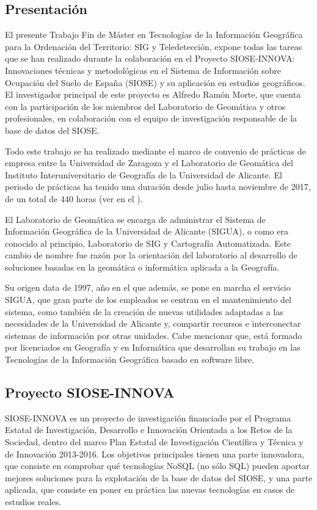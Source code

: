 
\begin{prologo}

\subsection*{Presentación}
El presente Trabajo Fin de Máster en Tecnologías de la Información Geográfica para la Ordenación del Territorio: SIG y Teledetección, expone todas las tareas que se han realizado durante la colaboración en el Proyecto SIOSE-INNOVA: Innovaciones técnicas y metodológicas en el Sistema de Información sobre Ocupación del Suelo de España (SIOSE) y su aplicación en estudios geográficos. El investigador principal de este proyecto es Alfredo Ramón Morte, que cuenta con la participación de los miembros del Laboratorio de Geomática y otros profesionales, en colaboración con el equipo de investigación responsable de la base de datos del SIOSE.

Todo este trabajo se ha realizado mediante el marco de convenio de prácticas de empresa entre la Universidad de Zaragoza y el Laboratorio de Geomática del Instituto Interuniversitario de Geografía de la Universidad de Alicante. El periodo de prácticas ha tenido una duración desde julio hasta noviembre de 2017, de un total de 440 horas (ver en el ).

El Laboratorio de Geomática se encarga de administrar el Sistema de Información Geográfica de la Universidad de Alicante (SIGUA), o como era conocido al principio, Laboratorio de SIG y Cartografía Automatizada. Este cambio de nombre fue razón por la orientación del laboratorio al desarrollo de soluciones basadas en la geomática o informática aplicada a la Geografía.

Su origen data de 1997, año en el que además, se pone en marcha el servicio SIGUA, que gran parte de los empleados se centran en el mantenimiento del sistema, como también de la creación de nuevas utilidades adaptadas a las necesidades de la Universidad de Alicante y, compartir recursos e interconectar sistemas de información por otras unidades. Cabe mencionar que, está formado por licenciados en Geografía y en Informática que desarrollan su trabajo en las Tecnologías de la Información Geográfica basado en software libre.

\subsection*{Proyecto SIOSE-INNOVA}
SIOSE-INNOVA es un proyecto de investigación financiado por el Programa Estatal de Investigación, Desarrollo e Innovación Orientada a los Retos de la Sociedad, dentro del marco Plan Estatal de Investigación Científica y Técnica y de Innovación 2013-2016. Los objetivos principales tienen una parte innovadora, que consiste en comprobar qué tecnologías NoSQL (no sólo SQL) pueden aportar mejores soluciones para la explotación de la base de datos del SIOSE, y una parte aplicada, que consiste en poner en práctica las nuevas tecnologías en casos de estudios reales.


\end{prologo}
